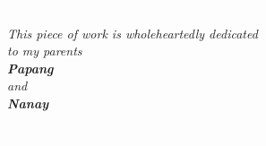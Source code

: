 \textcolor{white}{.}

\vspace{1 in} 

\begin{center}
{\itshape{\Large This piece of work is wholeheartedly dedicated\\ \vspace{10pt}
\Large to my parents\\ \vspace{10pt}   
\textbf{\huge Papang}\\ \vspace{10pt} 
\Large and\\ \vspace{7pt} 
\textbf{\huge Nanay}}}

\end{center}

\textcolor{white}{.}